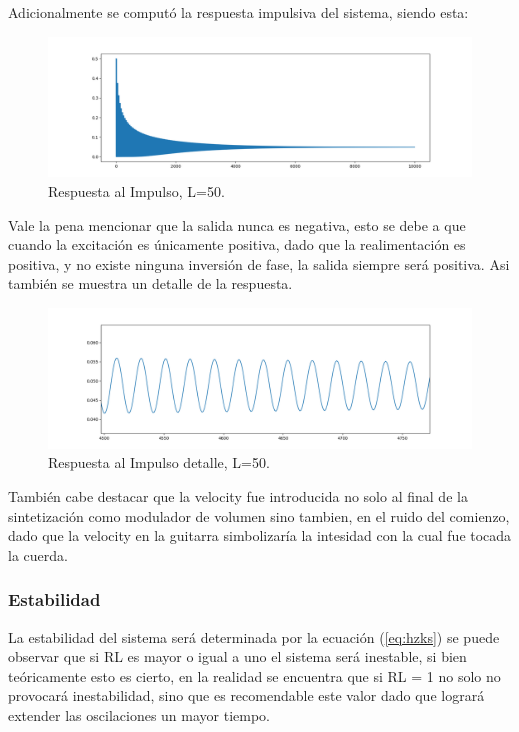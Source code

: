 Adicionalmente se computó la respuesta impulsiva del sistema, siendo esta:
\begin{figure}[H]
	\centering
	\includegraphics[width=\textwidth]{ImagenesEjercicio4/impulseResponse.PNG}
\caption{Respuesta al Impulso, L=50.}
	\label{fig:impulse}
\end{figure}
Vale la pena mencionar que la salida nunca es negativa, esto se debe a que cuando la excitación es únicamente positiva, dado que la realimentación es positiva, y no existe ninguna inversión de fase, la salida siempre será positiva.
Asi también se muestra un detalle de la respuesta.
\begin{figure}[H]
	\centering
	\includegraphics[width=\textwidth]{ImagenesEjercicio4/impulseResponseDETAIL.PNG}
\caption{Respuesta al Impulso detalle, L=50.}
	\label{fig:impulsed}
\end{figure}
También cabe destacar que la velocity fue introducida no solo al final de la sintetización como modulador de volumen sino tambien, en el ruido del comienzo, dado que la velocity en la guitarra simbolizaría la intesidad con la cual fue tocada la cuerda.
\subsubsection{Estabilidad}
La estabilidad del sistema será determinada por la ecuación (\ref{eq:hzks}) se puede observar que si RL es mayor o igual a uno el sistema será inestable, si bien teóricamente esto es cierto, en la realidad se encuentra que si RL = 1 no solo no provocará inestabilidad, sino que es recomendable este valor dado que logrará extender las oscilaciones  un mayor tiempo.
